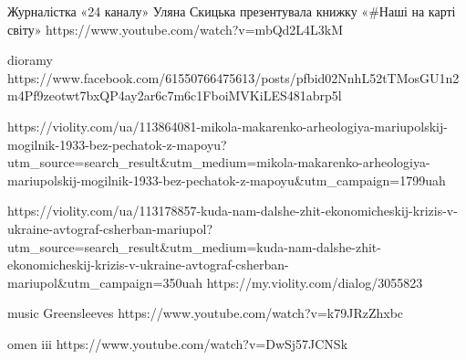  Журналістка «24 каналу» Уляна Скицька презентувала книжку «#Наші на карті світу» 
https://www.youtube.com/watch?v=mbQd2L4L3kM

dioramy
https://www.facebook.com/61550766475613/posts/pfbid02NnhL52tTMosGU1n2m4Pf9zeotwt7bxQP4ay2ar6c7m6c1FboiMVKiLES481abrp5l

https://violity.com/ua/113864081-mikola-makarenko-arheologiya-mariupolskij-mogilnik-1933-bez-pechatok-z-mapoyu?utm_source=search_result&utm_medium=mikola-makarenko-arheologiya-mariupolskij-mogilnik-1933-bez-pechatok-z-mapoyu&utm_campaign=1799uah

https://violity.com/ua/113178857-kuda-nam-dalshe-zhit-ekonomicheskij-krizis-v-ukraine-avtograf-csherban-mariupol?utm_source=search_result&utm_medium=kuda-nam-dalshe-zhit-ekonomicheskij-krizis-v-ukraine-avtograf-csherban-mariupol&utm_campaign=350uah
https://my.violity.com/dialog/3055823

music
Greensleeves
https://www.youtube.com/watch?v=k79JRzZhxbc

omen iii
https://www.youtube.com/watch?v=DwSj57JCNSk



